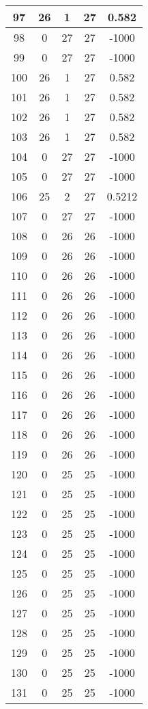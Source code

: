 \documentclass[letterpaper, 12pt]{article}
\begin{document}
\begin{longtable}{|c|c|c|c|c|}
\hline
97 & 26 & 1 & 27 & 0.582 \\
\hline
98 & 0 & 27 & 27 & -1000 \\
\hline
99 & 0 & 27 & 27 & -1000 \\
\hline
100 & 26 & 1 & 27 & 0.582 \\
\hline
101 & 26 & 1 & 27 & 0.582 \\
\hline
102 & 26 & 1 & 27 & 0.582 \\
\hline
103 & 26 & 1 & 27 & 0.582 \\
\hline
104 & 0 & 27 & 27 & -1000 \\
\hline
105 & 0 & 27 & 27 & -1000 \\
\hline
106 & 25 & 2 & 27 & 0.5212 \\
\hline
107 & 0 & 27 & 27 & -1000 \\
\hline
108 & 0 & 26 & 26 & -1000 \\
\hline
109 & 0 & 26 & 26 & -1000 \\
\hline
110 & 0 & 26 & 26 & -1000 \\
\hline
111 & 0 & 26 & 26 & -1000 \\
\hline
112 & 0 & 26 & 26 & -1000 \\
\hline
113 & 0 & 26 & 26 & -1000 \\
\hline
114 & 0 & 26 & 26 & -1000 \\
\hline
115 & 0 & 26 & 26 & -1000 \\
\hline
116 & 0 & 26 & 26 & -1000 \\
\hline
117 & 0 & 26 & 26 & -1000 \\
\hline
118 & 0 & 26 & 26 & -1000 \\
\hline
119 & 0 & 26 & 26 & -1000 \\
\hline
120 & 0 & 25 & 25 & -1000 \\
\hline
121 & 0 & 25 & 25 & -1000 \\
\hline
122 & 0 & 25 & 25 & -1000 \\
\hline
123 & 0 & 25 & 25 & -1000 \\
\hline
124 & 0 & 25 & 25 & -1000 \\
\hline
125 & 0 & 25 & 25 & -1000 \\
\hline
126 & 0 & 25 & 25 & -1000 \\
\hline
127 & 0 & 25 & 25 & -1000 \\
\hline
128 & 0 & 25 & 25 & -1000 \\
\hline
129 & 0 & 25 & 25 & -1000 \\
\hline
130 & 0 & 25 & 25 & -1000 \\
\hline
131 & 0 & 25 & 25 & -1000 \\

\end{longtable}
\end{document}
